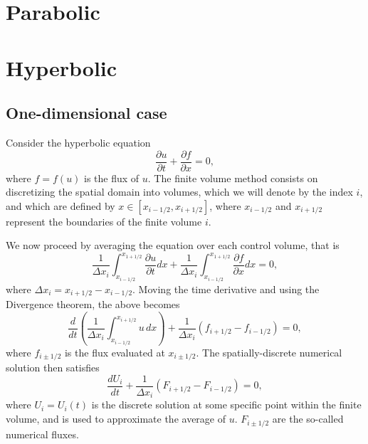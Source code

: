 \documentclass[oneside,a4paper,11pt]{report}
\begin{document}
\chapter{Parabolic}

\chapter{Hyperbolic}

\section{One-dimensional case}
Consider the hyperbolic equation
\begin{equation}
\frac{\partial u}{\partial t} + \frac{\partial f}{\partial x} = 0,
\end{equation}
where $f = f(u)$ is the flux of $u$. The finite volume method consists on discretizing the spatial domain into volumes, which we will denote by the index $i$, and which are defined by $x \in [x_{i-1/2}, x_{i+1/2}]$, where $x_{i-1/2}$ and $x_{i+1/2}$ represent the boundaries of the finite volume $i$.

We now proceed by averaging the equation over each control volume, that is
\begin{equation}
\frac{1}{\Delta x_i} \int_{x_{i-1/2}}^{x_{1+1/2}} \frac{\partial u}{\partial t} dx + \frac{1}{\Delta x_i} \int_{x_{i-1/2}}^{x_{1+1/2}} \frac{\partial f}{\partial x} dx = 0,
\end{equation}
where $\Delta x_i = x_{i+1/2} - x_{i-1/2}$. Moving the time derivative and using the Divergence theorem, the above becomes
\begin{equation}
\frac{d}{d t} \left( \frac{1}{\Delta x_i} \int_{x_{i-1/2}}^{x_{i+1/2}} u \,dx \right) + \frac{1}{\Delta x_i} ( f_{i+1/2} - f_{i-1/2} ) = 0,
\end{equation}
where $f_{i \pm 1/2}$ is the flux evaluated at $x_{i \pm 1/2}$. The spatially-discrete numerical solution then satisfies 
\begin{equation}
\frac{d U_i}{dt} + \frac{1}{\Delta x_i} ( F_{i+1/2} - F_{i-1/2} ) = 0,
\end{equation}
where $U_i = U_i(t)$ is the discrete solution at some specific point within the finite volume, and is used to approximate the average of $u$. $F_{i \pm 1/2}$ are the so-called numerical fluxes.
\end{document}
